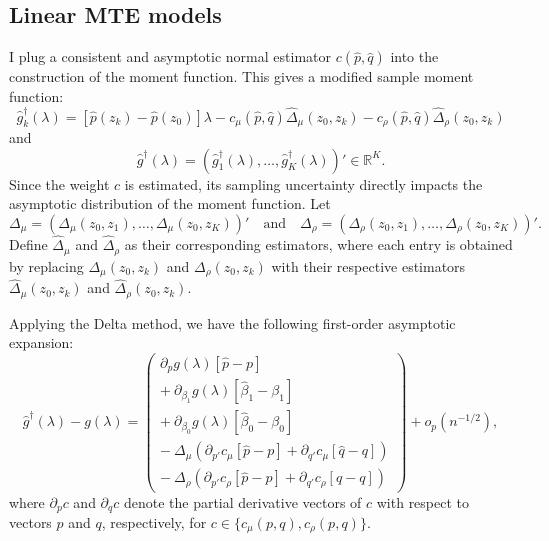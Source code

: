 \documentclass[11pt]{article}
\theoremstyle{definition}
\newcommand{\R}{\ensuremath{\mathbb{R}}}
\newcommand{\0}{\ensuremath{\mathbf{0}}}
\begin{document}
\begin{bibunit}
\subsection{Linear MTE models}
\label{sec:cond_wald_est_weight}
I plug a consistent and asymptotic normal estimator $c(\hat{p}, \hat{q})$ into the construction of the moment function. This gives a modified sample moment function:
\[
    \hat{g}_k^\dagger(\lambda) = \left[\hat{p}(z_k) - \hat{p}(z_0)\right]\lambda - c_\mu(\hat{p},\hat{q})\hat{\Delta}_\mu(z_0,z_k) - c_\rho(\hat{p},\hat{q}) \hat{\Delta}_\rho(z_0,z_k)
\]
and 
\[
    \hat{g}^{\dagger}(\lambda) = (\hat{g}_1^\dagger(\lambda), \ldots, \hat{g}_K^\dagger(\lambda))'\in\R^K.
\]
Since the weight $c$ is estimated, its sampling uncertainty directly impacts  the asymptotic distribution of the moment function. Let 
\[
    {\Delta}_\mu = ({\Delta}_\mu(z_0,z_1), \ldots, {\Delta}_\mu(z_0,z_K))' \quad \text{and} \quad {\Delta}_\rho = ({\Delta}_\rho(z_0,z_1), \ldots, {\Delta}_\rho(z_0,z_K))'.
\]
Define $\hat{\Delta}_\mu$ and $\hat{\Delta}_\rho$ as their corresponding estimators, where each entry is obtained by replacing ${\Delta}_\mu(z_0,z_k)$ and ${\Delta}_\rho(z_0,z_k)$ with their respective estimators $\hat{\Delta}_\mu(z_0,z_k)$ and $\hat{\Delta}_\rho(z_0,z_k)$.

Applying the Delta method, we have the following first-order asymptotic expansion:
\[
    \hat{g}^\dagger(\lambda) - g(\lambda)
    = \begin{pmatrix}
	\partial_{p} {g}(\lambda)[\hat{p} - p] \\
	+ ~\partial_{\beta_1} {g}(\lambda)[\hat{\beta}_1 - \beta_1] \\
	+ ~\partial_{\beta_0} {g}(\lambda)[\hat{\beta}_0 - \beta_0] \\
        - ~\Delta_\mu(\partial_{p'}c_\mu[\hat{p} - p] + \partial_{q'}c_\mu[\hat{q} - q]) \\
        - ~\Delta_\rho(\partial_{p'}c_\rho[\hat{p} - p] + \partial_{q'}c_\rho[\hat{q} - q])
      \end{pmatrix}
	+ o_p(n^{-1/2}),
\]
where $\partial_p c$ and $\partial_q c$ denote the partial derivative vectors of $c$ with respect to vectors $p$ and $q$, respectively, for $c \in \{c_\mu(p,q), c_\rho(p,q)\}$. 



\end{bibunit}
\end{document}
